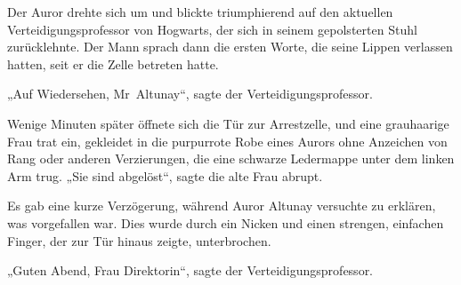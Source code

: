 
Der Auror drehte sich um und blickte triumphierend auf den aktuellen Verteidigungsprofessor von Hogwarts, der sich in seinem gepolsterten Stuhl zurücklehnte.
Der Mann sprach dann die ersten Worte, die seine Lippen verlassen hatten, seit er die Zelle betreten hatte.

„Auf Wiedersehen, Mr~Altunay“, sagte der Verteidigungsprofessor.

Wenige Minuten später öffnete sich die Tür zur Arrestzelle, und eine grauhaarige Frau trat ein, gekleidet in die purpurrote Robe eines Aurors ohne Anzeichen von Rang oder anderen Verzierungen, die eine schwarze Ledermappe unter dem linken Arm trug.
„Sie sind abgelöst“, sagte die alte Frau abrupt.

Es gab eine kurze Verzögerung, während Auror Altunay versuchte zu erklären, was vorgefallen war. Dies wurde durch ein Nicken und einen strengen, einfachen Finger, der zur Tür hinaus zeigte, unterbrochen.

„Guten Abend, Frau Direktorin“, sagte der Verteidigungsprofessor.

